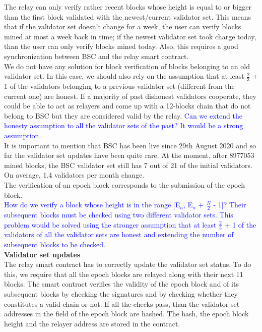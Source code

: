 The relay can only verify rather recent blocks whose height is equal to or bigger than the first block validated with the newest/current validator set. This means that if the validator set doesn't change for a week, the user can verify blocks mined at most a week back in time; if the newest validator set took charge today, than the user can only verify blocks mined today. Also, this requires a good synchronization between BSC and the relay smart contract. \\We do not have any solution for block verification of blocks belonging to an old validator set. In this case, we should also rely on the assumption that at least $\frac{2}{3}$ + 1 of the validators belonging to a previous validator set (different from the current one) are honest. If a majority of past dishonest validators cooperate, they could be able to act as relayers and come up with a 12-blocks chain that do not belong to BSC but they are considered valid by the relay. \textcolor{blue}{Can we extend the honesty assumption to all the validator sets of the past? It would be a strong assumption.}\\
It is important to mention that BSC has been live since 29th August 2020 and so far the validator set updates have been quite rare. At the moment, after 8977053 mined blocks, the BSC validator set still has 7 out of 21 of the initial validators. On average, 1.4 validators per month change.\\The verification of an epoch block corresponds to the submission of the epoch block.\\ \textcolor{blue}{How do we verify a block whose height is in the range [E$_{n}$, E$_n$ + $\frac{N}{2}$ - 1]? Their subsequent blocks must be checked using two different validator sets. This problem would be solved using the stronger assumption that at least $\frac{2}{3}$ + 1 of the validators of all the validator sets are honest and extending the number of subsequent blocks to be checked.}\\

\noindent
\textbf{Validator set updates}\\
The relay smart contract has to correctly update the validator set status. To do this, we require that all the epoch blocks are relayed along with their next 11 blocks. The smart contract verifies the validity of the epoch block and of its subsequent blocks by checking the signatures and by checking whether they constitutes a valid chain or not. If all the checks pass, than the validator set addresses in the \extradata field of the epoch block are hashed. The hash, the epoch block height and the relayer address are stored in the contract.\\

